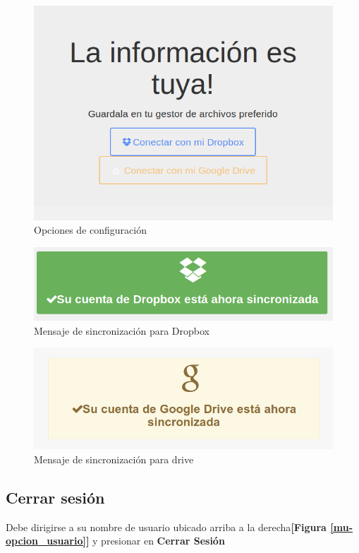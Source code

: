\begin{figure}
	\centering
	\includegraphics[width=.8\textwidth]{img/manual_de_usuario/configurar_almacenamiento}
	\caption{Opciones de configuración}
	\label{mu-configurar_almacenamiento}
\end{figure}
\begin{figure}
	\centering
	\includegraphics[width=.8\textwidth]{img/manual_de_usuario/cuenta_sincronizada}
	\caption{Mensaje de sincronización para Dropbox}
	\label{mu-cuenta_sincronizada}
\end{figure}
\begin{figure}
	\centering
	\includegraphics[width=.8\textwidth]{img/manual_de_usuario/drive_sincronizado}
	\caption{Mensaje de sincronización para drive}
	\label{drive_sincronizado}
\end{figure}

\subsection{Cerrar sesión}
Debe dirigirse a su nombre de usuario ubicado arriba a la derecha\textbf{[Figura \ref{mu-opcion_usuario}]} y presionar en \textbf{Cerrar Sesión}



